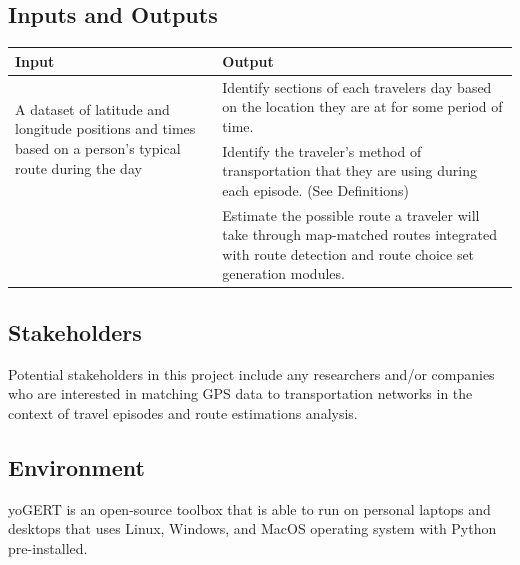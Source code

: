 \documentclass{article}
\begin{document}
\subsection{Inputs and Outputs}
\begin{table}[h]
    \centering
    \begin{tabular}{|p{6cm}|p{6cm}|}
    \hline
    Input & Output  \\
    \hline
    \multirow{2}{5cm}{A dataset of latitude and longitude positions and times based on a person's typical route during the day} & Identify sections of each travelers day based on the location they are at for some period of time.  \\\cline{2-2} 
    & Identify the traveler's method of transportation that they are using during each episode. (See Definitions)  \\\cline{2-2} 
    & Estimate the possible route a traveler will take through map-matched routes integrated with route detection and route choice set generation modules.\\\cline{2-2}  
    \hline
    \end{tabular}
\end{table}

\subsection{Stakeholders}
Potential stakeholders in this project include any researchers and/or companies who are interested in matching GPS data to transportation networks in the context of travel episodes and route estimations analysis. 

\subsection{Environment}
yoGERT is an open-source toolbox that is able to run on personal laptops and desktops that uses Linux, Windows, and MacOS operating system 
with Python pre-installed.

\newpage
\end{document}
